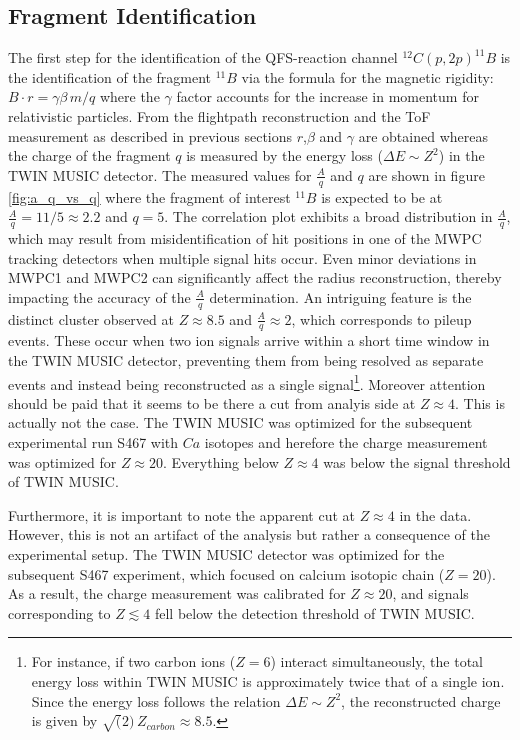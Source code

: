 \subsection{Fragment Identification}\label{sec:frag_ident}
The first step for the identification of the QFS-reaction channel $^{12}C(p,2p)^{11}B$ is the identification of the fragment $^{11}B$ via the formula for the magnetic rigidity: $ B\cdot r = \gamma\beta \, m /q$ where the $\gamma$ factor accounts for the increase in momentum for relativistic particles. From the flightpath reconstruction and the ToF measurement as described in previous sections $r$,$\beta$ and $\gamma$ are obtained whereas the charge of the fragment $q$ is measured by the energy loss ($\Delta E \sim Z^2$) in the TWIN MUSIC detector.\newline
The measured values for $\frac{A}{q}$ and $q$ are shown in figure \ref{fig:a_q_vs_q} where the fragment of interest $^{11}B$ is expected to be at $\frac{A}{q} = 11/5 \approx 2.2$ and $q = 5$. The correlation plot exhibits a broad distribution in $\frac{A}{q}$, which may result from misidentification of hit positions in one of the MWPC tracking detectors when multiple signal hits occur. Even minor deviations in MWPC1 and MWPC2 can significantly affect the radius reconstruction, thereby impacting the accuracy of the $\frac{A}{q}$ determination.\newline
An intriguing feature is the distinct cluster observed at $Z \approx 8.5$ and $\frac{A}{q} \approx 2$, which corresponds to pileup events. These occur when two ion signals arrive within a short time window in the TWIN MUSIC detector, preventing them from being resolved as separate events and instead being reconstructed as a single signal\footnote{For instance, if two carbon ions ($Z=6$) interact simultaneously, the total energy loss within TWIN MUSIC is approximately twice that of a single ion. Since the energy loss follows the relation $\Delta E \sim Z^2$, the reconstructed charge is given by $\sqrt(2)\,Z_{carbon} \approx 8.5 $.}.
Moreover attention should be paid that it seems to be there a cut from analyis side at $Z \approx 4$. This is actually not the case. The TWIN MUSIC was optimized for the subsequent experimental run S467 with $Ca$ isotopes and herefore the charge measurement was optimized for $Z\approx 20$. Everything below $Z \approx 4$ was below the signal threshold of TWIN MUSIC.

Furthermore, it is important to note the apparent cut at $Z \approx 4$ in the data. However, this is not an artifact of the analysis but rather a consequence of the experimental setup. The TWIN MUSIC detector was optimized for the subsequent S467 experiment, which focused on calcium isotopic chain ($Z = 20$). As a result, the charge measurement was calibrated for $Z \approx 20$, and signals corresponding to $Z \lesssim 4$ fell below the detection threshold of TWIN MUSIC.

